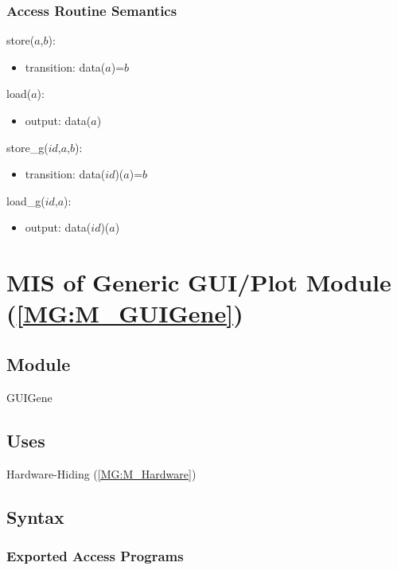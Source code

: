 \documentclass[12pt, titlepage]{article}
\begin{document}
\subsubsection{Access Routine Semantics}

\noindent store($a$,$b$):
\begin{itemize}
\item transition: data($a$)=$b$
\end{itemize}

\noindent load($a$):
\begin{itemize}
\item output: data($a$)
\end{itemize}

\noindent store{\_}g($id$,$a$,$b$):
\begin{itemize}
\item transition: data($id$)($a$)=$b$
\end{itemize}

\noindent load{\_}g($id$,$a$):
\begin{itemize}
\item output: data($id$)($a$)
\end{itemize}

\section{MIS of Generic GUI/Plot Module (\texorpdfstring{\cref{MG:M_GUIGene}}))} 
\label{MIS_GUIGene}


\subsection{Module}
GUIGene
\subsection{Uses}
Hardware-Hiding (\cref{MG:M_Hardware})
\subsection{Syntax}

\subsubsection{Exported Access Programs}
\end{document}

